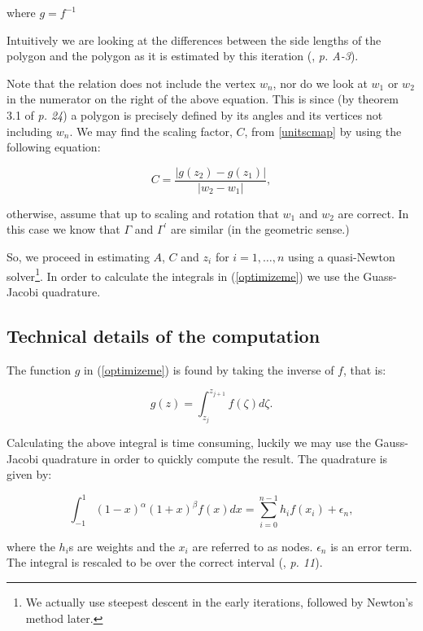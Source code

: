 \documentclass[a4paper,10pt]{amsart}
\begin{document}
where $g=f^{-1}$ 

Intuitively we are looking at the differences between the side lengths of the polygon and the polygon as it is estimated by this iteration (\cite{snider}, \emph{p. A-3}).

Note that the relation does not include the vertex $w_n$, nor do we look at $w_1$ or $w_2$ in the numerator on the right of the above equation. This is since (by theorem 3.1 of \cite{driscoll} \emph{p. 24}) a polygon is precisely defined by its angles and its vertices not including $w_n$. We may find the scaling factor, $C$, from \ref{unitscmap} by using the following equation:

\begin{equation}
C=\frac{\vert g(z_2)-g(z_1)\vert}{\vert w_2 - w_1\vert},
\end{equation}

otherwise, assume that up to scaling and rotation that $w_1$ and $w_2$ are correct. In this case we know that $\Gamma$ and $\Gamma^\prime$ are similar (in the geometric sense.) 

So, we proceed in estimating $A$, $C$ and $z_i$ for $i=1,\dots,n$ using a quasi-Newton solver\footnote{We actually use steepest descent in the early iterations, followed by Newton's method later.}. In order to calculate the integrals in (\ref{optimizeme}) we use the Guass-Jacobi quadrature.



\subsection{Technical details of the computation}



The function $g$ in (\ref{optimizeme}) is found by taking the inverse of $f$, that is:

\begin{equation}
g(z) = \int_{z_j}^{z_{j+1}} f(\zeta) d\zeta.
\end{equation}

Calculating the above integral is time consuming, luckily we may use the Gauss-Jacobi quadrature in order to quickly compute the result. The quadrature is given by:

\begin{equation}
\int_{-1}^{1} (1-x)^\alpha (1+x)^\beta f(x) dx = \sum_{i=0}^{n-1}h_if(x_i) + \epsilon_n,
\end{equation}

where the $h_i$s are weights and the $x_i$ are referred to as nodes. $\epsilon_n$ is an error term. The integral is rescaled to be over the correct interval (\cite{trefethen}, \emph{p. 11}).
\end{document}

